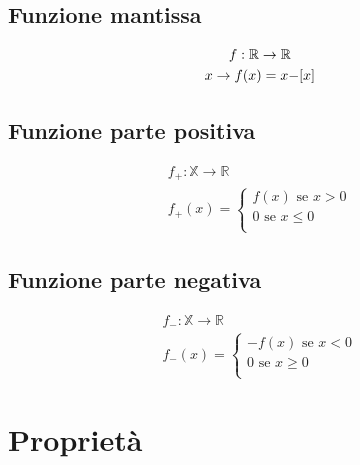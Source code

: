 \subsection{Funzione mantissa}
\begin{equation}
\begin{gathered}
f: \mathbb{R} \rightarrow \mathbb{R}\\
x \rightarrow f(x) = x - $[$x$]$
\end{gathered}
\end{equation}

\subsection{Funzione parte positiva}
\begin{equation}
\begin{gathered}
f_+: \mathbb{X} \rightarrow \mathbb{R}\\
f_+(x)=\begin{cases}
f(x) \text{ se } x>0\\
0 \text{ se } x \leq 0\\
\end{cases}
\end{gathered}
\end{equation}

\subsection{Funzione parte negativa}
\begin{equation}
\begin{gathered}
f_-: \mathbb{X} \rightarrow \mathbb{R}\\
f_-(x)=\begin{cases}
-f(x) \text{  se } x<0\\
0 \text{  se } x \geq 0\\
\end{cases}
\end{gathered}
\end{equation}

\section{Proprietà}
